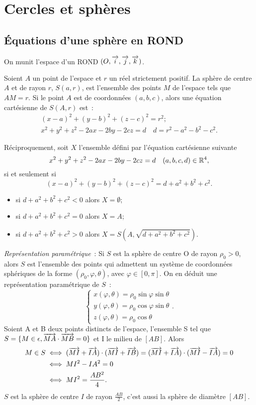 \section{Cercles et sphères}

\subsection{Équations d'une sphère en ROND}

On munit l'espace d'un ROND $(O,\overrightarrow{i},\overrightarrow{j},\overrightarrow{k})$.
\begin{defdef}
  Soient $A$ un point de l'espace et $r$ un réel strictement positif. La sphère de centre $A$ et de rayon $r$, $S(a,r)$, est l'ensemble des points $M$ de l'espace tels que $AM=r$. Si le point $A$ est de coordonnées $(a,b,c)$, alors une équation cartésienne de $S(A,r)$ est~:
  \begin{gather}
    (x-a)^2+(y-b)^2+(z-c)^2=r^2; \\
    x^2+y^2+z^2-2ax-2by-2cz=d \quad d=r^2-a^2-b^2-c^2.
  \end{gather}
\end{defdef}
Réciproquement, soit $X$ l'ensemble défini par l'équation cartésienne suivante
\begin{equation}
  x^2+y^2+z^2-2ax-2by-2cz=d \quad (a,b,c,d)\in \mathbb{R}^4,
\end{equation}
si et seulement si
\begin{equation}
  (x-a)^2+(y-b)^2+(z-c)^2=d+a^2+b^2+c^2.
\end{equation}
\begin{itemize}
\item si $d+a^2+b^2+c^2<0$ alors $X=\emptyset$;
\item si $d+a^2+b^2+c^2=0$ alors $X=A$;
\item si $d+a^2+b^2+c^2>0$ alors $X=S(A,\sqrt{d+a^2+b^2+c^2})$.
\end{itemize}

\emph{Représentation paramétrique}~: Si $S$ est la sphère de centre O de rayon $\rho_0>0$, alors $S$ est l'ensemble des points qui admettent un système de coordonnées sphériques de la forme $(\rho_0,\varphi,\theta)$, avec $\varphi\in[0,\pi]$.
On en déduit une représentation paramétrique de $S$~:
\begin{equation}
  \begin{cases}
    x(\varphi,\theta)=\rho_0\sin\varphi\sin\theta\\
    y(\varphi,\theta)=\rho_0\cos\varphi\sin\theta\\
    z(\varphi,\theta)=\rho_0\cos\theta
  \end{cases}.
\end{equation}
Soient A et B deux points distincts de l'espace, l'ensemble S tel que $S=\{M \in \epsilon, \overrightarrow{MA}\cdot\overrightarrow{MB}=0\}$ et I le milieu de $[AB]$. Alors
\begin{align}
  M \in S & \iff (\overrightarrow{MI}+\overrightarrow{IA})\cdot(\overrightarrow{MI}+\overrightarrow{IB})= (\overrightarrow{MI}+\overrightarrow{IA})\cdot(\overrightarrow{MI}-\overrightarrow{IA})=0\\
  &\iff MI^2-IA^2=0\\
  &\iff MI^2=\frac{AB^2}{4}.
\end{align}
$S$ est la sphère de centre $I$ de rayon $\frac{AB}{2}$, c'est aussi la sphère de diamètre $[AB]$.

